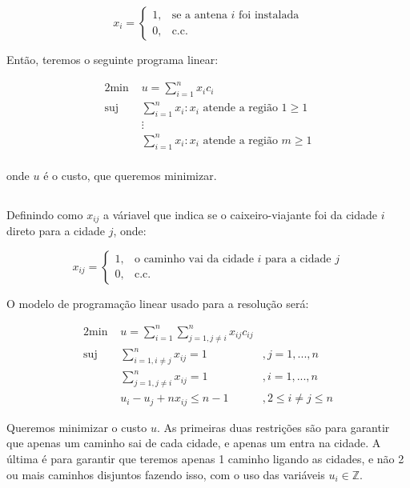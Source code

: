 \documentclass[12pt,letterpaper]{article}
\begin{document}
	\begin{equation}
		x_i=
		\begin{cases}
			1, & \text{se a antena $i$ foi instalada} \\
			0, & \text{c.c.}
		\end{cases}
	\end{equation}
	
	Então, teremos o seguinte programa linear:
	
	\begin{alignat*}{2}
		\text{min  } & u = \sum_{i=1}^{n} x_ic_i \\
		\text{suj  } & \sum_{i=1}^{n} x_i : x_i \text{ atende a região $1$} \geq 1\\
			         & \vdots \\
		             & \sum_{i=1}^{n} x_i : x_i \text{ atende a região $m$} \geq 1\\
	\end{alignat*}
	
	onde $u$ é o custo, que queremos minimizar.
	
	\subsection{ } Definindo como $x_{ij}$ a váriavel que indica se o caixeiro-viajante foi da cidade $i$ direto para a cidade $j$, onde:
	
	\begin{equation}
		x_{ij}=
		\begin{cases}
			1, & \text{o caminho vai da cidade $i$ para a cidade $j$} \\
			0, & \text{c.c.}
		\end{cases}
	\end{equation}
	
	O modelo de programação linear usado para a resolução será:
		
	\begin{alignat*}{2}
		\text{min  } & u = \sum_{i=1}^{n} \sum_{j=1, j\neq i}^{n} x_{ij}c_{ij} \\
		\text{suj  } & \sum_{i=1, i \neq j}^{n} x_{ij} = 1 &,j = 1,...,n\\
		             & \sum_{j=1, j \neq i}^{n} x_{ij} = 1 &,i = 1,...,n\\
		             & u_i - u_j + nx_{ij} \leq n-1        &,2\leq i\neq j \leq n
	\end{alignat*}
	
	Queremos minimizar o custo $u$. As primeiras duas restrições são para garantir que apenas um caminho sai de cada cidade, e apenas um entra na cidade. A última é para garantir que teremos apenas 1 caminho ligando as cidades, e não 2 ou mais caminhos disjuntos fazendo isso, com o uso das variáveis $u_i \in \mathbb{Z}$.
	
\end{document}
